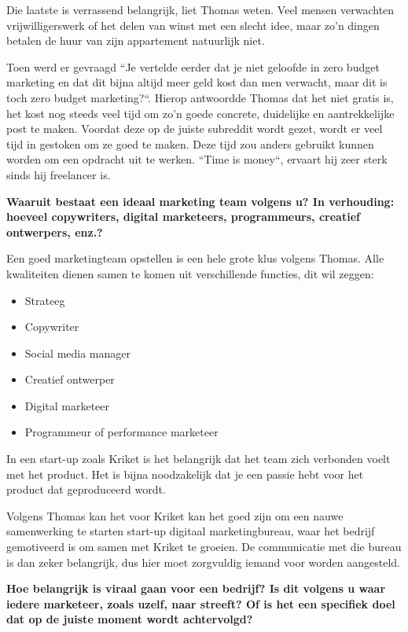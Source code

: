 Die laatste is verrassend belangrijk, liet Thomas weten. Veel mensen verwachten vrijwilligerswerk of het delen van winst met een slecht idee, maar zo'n dingen betalen de huur van zijn appartement natuurlijk niet.

Toen werd er gevraagd ``Je vertelde eerder dat je niet geloofde in zero budget marketing en dat dit bijna altijd meer geld kost dan men verwacht, maar dit is toch zero budget marketing?``. Hierop antwoordde Thomas dat het niet gratis is, het kost nog steeds veel tijd om zo'n goede concrete, duidelijke en aantrekkelijke post te maken. Voordat deze op de juiste subreddit wordt gezet, wordt er veel tijd in gestoken om ze goed te maken. Deze tijd zou anders gebruikt kunnen worden om een opdracht uit te werken. ``Time is money``, ervaart hij zeer sterk sinds hij freelancer is.
	
\textbf{Waaruit bestaat een ideaal marketing team volgens u? In verhouding: hoeveel copywriters, digital marketeers, programmeurs, creatief ontwerpers, enz.?}
	
Een goed marketingteam opstellen is een hele grote klus volgens Thomas. Alle kwaliteiten dienen samen te komen uit verschillende functies, dit wil zeggen:

\begin{itemize} 
	\item Strateeg
	\item Copywriter
	\item Social media manager
	\item Creatief ontwerper
	\item Digital marketeer
	\item Programmeur of performance marketeer
\end{itemize} 

In een start-up zoals Kriket is het belangrijk dat het team zich verbonden voelt met het product. Het is bijna noodzakelijk dat je een passie hebt voor het product dat geproduceerd wordt.

Volgens Thomas kan het voor Kriket kan het goed zijn om een nauwe samenwerking te starten start-up digitaal marketingbureau, waar het bedrijf gemotiveerd is om samen met Kriket te groeien. De communicatie met die bureau is dan zeker belangrijk, dus hier moet zorgvuldig iemand voor worden aangesteld.
	
\textbf{Hoe belangrijk is viraal gaan voor een bedrijf? Is dit volgens u waar iedere marketeer, zoals uzelf, naar streeft? Of is het een specifiek doel dat op de juiste moment wordt achtervolgd?}
	
